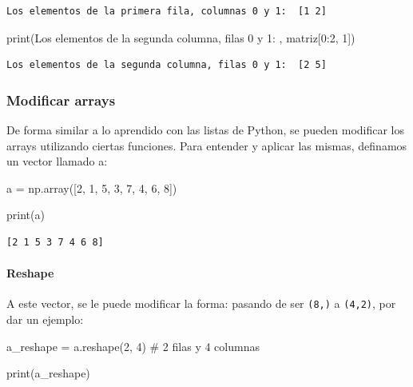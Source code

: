 \documentclass[
  letterpaper,
  DIV=11,
  numbers=noendperiod]{scrreprt}
\let\oldparagraph\paragraph
\renewcommand{\paragraph}[1]{\oldparagraph{#1}\mbox{}}
\newenvironment{Shaded}{\begin{snugshade}}{\end{snugshade}}
\newcommand{\BuiltInTok}[1]{\textcolor[rgb]{0.00,0.23,0.31}{#1}}
\newcommand{\CommentTok}[1]{\textcolor[rgb]{0.37,0.37,0.37}{#1}}
\newcommand{\DecValTok}[1]{\textcolor[rgb]{0.68,0.00,0.00}{#1}}
\newcommand{\NormalTok}[1]{\textcolor[rgb]{0.00,0.23,0.31}{#1}}
\newcommand{\OperatorTok}[1]{\textcolor[rgb]{0.37,0.37,0.37}{#1}}
\newcommand{\StringTok}[1]{\textcolor[rgb]{0.13,0.47,0.30}{#1}}
\begin{document}
\begin{verbatim}
Los elementos de la primera fila, columnas 0 y 1:  [1 2]
\end{verbatim}

\begin{Shaded}
\begin{Highlighting}[]
\BuiltInTok{print}\NormalTok{(}\StringTok{\textquotesingle{}Los elementos de la segunda columna, filas 0 y 1: \textquotesingle{}}\NormalTok{, matriz[}\DecValTok{0}\NormalTok{:}\DecValTok{2}\NormalTok{, }\DecValTok{1}\NormalTok{])}
\end{Highlighting}
\end{Shaded}

\begin{verbatim}
Los elementos de la segunda columna, filas 0 y 1:  [2 5]
\end{verbatim}

\subsubsection{Modificar arrays}\label{modificar-arrays}

De forma similar a lo aprendido con las listas de Python, se pueden
modificar los arrays utilizando ciertas funciones. Para entender y
aplicar las mismas, definamos un vector llamado a:

\begin{Shaded}
\begin{Highlighting}[]
\NormalTok{a }\OperatorTok{=}\NormalTok{ np.array([}\DecValTok{2}\NormalTok{, }\DecValTok{1}\NormalTok{, }\DecValTok{5}\NormalTok{, }\DecValTok{3}\NormalTok{, }\DecValTok{7}\NormalTok{, }\DecValTok{4}\NormalTok{, }\DecValTok{6}\NormalTok{, }\DecValTok{8}\NormalTok{])}

\BuiltInTok{print}\NormalTok{(a)}
\end{Highlighting}
\end{Shaded}

\begin{verbatim}
[2 1 5 3 7 4 6 8]
\end{verbatim}

\paragraph{Reshape}\label{reshape}

A este vector, se le puede modificar la forma: pasando de ser
\texttt{(8,)} a \texttt{(4,2)}, por dar un ejemplo:

\begin{Shaded}
\begin{Highlighting}[]
\NormalTok{a\_reshape }\OperatorTok{=}\NormalTok{ a.reshape(}\DecValTok{2}\NormalTok{, }\DecValTok{4}\NormalTok{) }\CommentTok{\# 2 filas y 4 columnas}

\BuiltInTok{print}\NormalTok{(a\_reshape)}
\end{Highlighting}
\end{Shaded}
\end{document}
